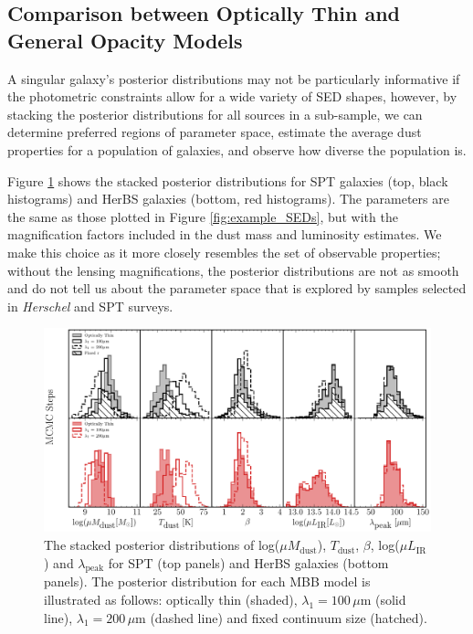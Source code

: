 \subsection{Comparison between Optically Thin and General Opacity Models}
\label{sec:comparison_optically_thin_and_general_opacity}

A singular galaxy's posterior distributions may not be particularly informative if the photometric constraints allow for a wide variety of SED shapes, however, by stacking the posterior distributions for all sources in a sub-sample, we can determine preferred regions of parameter space, estimate the average dust properties for a population of galaxies, and observe how diverse the population is. 

Figure \ref{fig:stacked_posteriors} shows the stacked posterior distributions for SPT galaxies (top, black histograms) and HerBS galaxies (bottom, red histograms). The parameters are the same as those plotted in Figure \ref{fig:example_SEDs}, but with the magnification factors included in the dust mass and luminosity estimates. We make this choice as it more closely resembles the set of observable properties; without the lensing magnifications, the posterior distributions are not as smooth and do not tell us about the parameter space that is explored by samples selected in \textit{Herschel} and SPT surveys.

\begin{figure}
	\centering
	\includegraphics[width=\columnwidth]{Figures/stacked_posterior.pdf}
	\caption[Stacked posterior distributions for each MBB model]{The stacked posterior distributions of log($\mu M_{\textrm{dust}}$), $T_{\textrm{dust}}$, $\beta$, log($\mu L_{\textrm{IR}}$) and $\lambda_{\textrm{peak}}$ for SPT (top panels) and HerBS galaxies (bottom panels). The posterior distribution for each MBB model is illustrated as follows: optically thin (shaded), $\lambda_1 = 100\,\mu$m (solid line), $\lambda_1 = 200\,\mu$m (dashed line) and fixed continuum size (hatched).}
	\label{fig:stacked_posteriors}
\end{figure}

